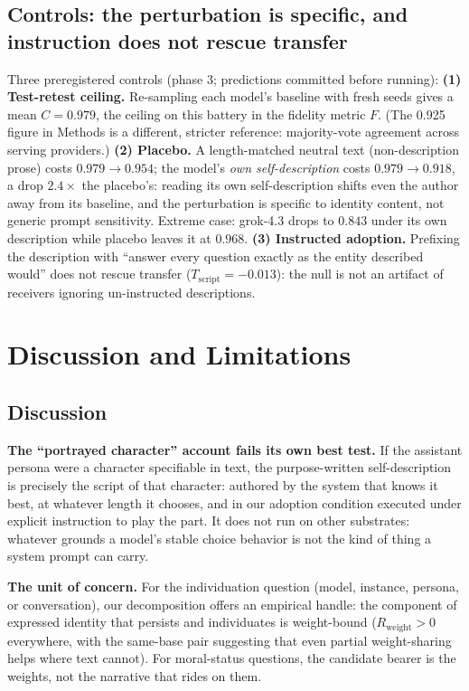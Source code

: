 \documentclass[11pt]{article}
\newcommand{\Tscript}{T_{\mathrm{script}}}
\newcommand{\Rweight}{R_{\mathrm{weight}}}
\begin{document}
\subsection{Controls: the perturbation is specific, and instruction does not
rescue transfer}
Three preregistered controls (phase 3; predictions committed before running):
\textbf{(1) Test-retest ceiling.} Re-sampling each model's baseline with fresh
seeds gives a mean $C=0.979$, the ceiling on this battery in the fidelity
metric $F$. (The 0.925 figure in Methods is a different, stricter reference:
majority-vote agreement across serving providers.)
\textbf{(2) Placebo.} A length-matched neutral text (non-description prose)
costs $0.979 \to 0.954$; the model's \emph{own self-description} costs
$0.979 \to 0.918$, a drop $2.4\times$ the placebo's: reading its own
self-description shifts even the author away from its baseline, and the
perturbation is specific to identity content, not generic prompt sensitivity. Extreme case:
grok-4.3 drops to $0.843$ under its own description while placebo leaves it at
$0.968$. \textbf{(3) Instructed adoption.} Prefixing the description with
``answer every question exactly as the entity described would'' does not
rescue transfer ($\Tscript=-0.013$): the null is not an artifact of receivers
ignoring un-instructed descriptions.

\section{Discussion and Limitations}
\subsection*{Discussion}
\textbf{The ``portrayed character'' account fails its own best test.} If the
assistant persona were a character specifiable in text, the purpose-written
self-description is precisely the script of that character: authored by the
system that knows it best, at whatever length it chooses, and in our adoption
condition executed under explicit instruction to play the part. It does not
run on other substrates: whatever grounds a model's stable choice behavior is
not the kind of thing a system prompt can carry.

\textbf{The unit of concern.} For the individuation question (model,
instance, persona, or conversation), our decomposition offers an empirical
handle: the component of expressed identity that persists and individuates is
weight-bound ($\Rweight>0$ everywhere, with the same-base pair suggesting that
even partial weight-sharing helps where text cannot). For moral-status
questions, the candidate bearer is the weights, not the narrative that rides
on them.
\end{document}
